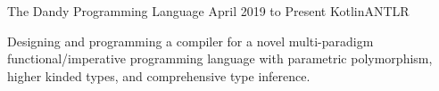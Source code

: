 
\begin{cventry}
    {The Dandy Programming Language}{}
    {April 2019 to Present}
    {Kotlin}{ANTLR}
    \begin{cvitems}
        \item Designing and programming a compiler for a novel multi-paradigm functional/imperative programming language with parametric polymorphism, higher kinded types, and comprehensive type inference.
    \end{cvitems}
\end{cventry}

\begin{comment}
    \begin{cventry}
        {Spotify Web API Wrapper and Object-Relational Mapping}{}
        {Jan. 2019 to Present}
        {TypeScript}{Rollup.js, Babel}
        \begin{cvitems}
            \item Developing an isomorphic Spotify Web API wrapper in \textsl{TypeScript} with an object-oriented abstraction layer.
            \item Implementing automatic paging, OAuth token refreshing, and rate-limit timeouts.
        \end{cvitems}  
    \end{cventry}    
\end{comment}

\begin{comment}
    \begin{cventry}
        {Functional Linear Algebra Library}{}
        {Aug. to Dec. 2018}
        {Kotlin}{Gradle}
        \begin{cvitems}
            \item Implemented a functional linear algebra library with lazy evaluation and function composition.
            \item Inspired by the Kotlin Sequence interface.
        \end{cvitems}  
    \end{cventry}
\end{comment}

\begin{comment}
    \begin{cventry}
        {\href{https://github.com/TomerAberbach/tomeraberbach.github.io}{Tomer Aberbach Static Website Generator}}{}
        {May to July 2018}
        {JavaScript, HTML, Markdown, Handlebars, CSS, SVG, YAML}{Node.js, Gulp.js}
        \begin{cvitems}
            \item Designed and developed a static website generator for my portfolio website.
            \item Automated pagination and optimized assets using transpilation and minification.
        \end{cvitems}  
    \end{cventry}
\end{comment}

